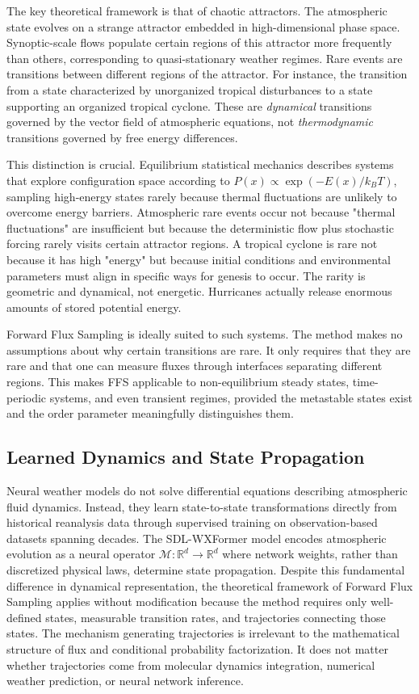 \documentclass[11pt]{article}
\begin{document}
The key theoretical framework is that of chaotic attractors. The atmospheric state evolves on a strange attractor embedded in high-dimensional phase space. Synoptic-scale flows populate certain regions of this attractor more frequently than others, corresponding to quasi-stationary weather regimes. Rare events are transitions between different regions of the attractor. For instance, the transition from a state characterized by unorganized tropical disturbances to a state supporting an organized tropical cyclone. These are \textit{dynamical} transitions governed by the vector field of atmospheric equations, not \textit{thermodynamic} transitions governed by free energy differences.

This distinction is crucial. Equilibrium statistical mechanics describes systems that explore configuration space according to $P(x) \propto \exp(-E(x)/k_BT)$, sampling high-energy states rarely because thermal fluctuations are unlikely to overcome energy barriers. Atmospheric rare events occur not because "thermal fluctuations" are insufficient but because the deterministic flow plus stochastic forcing rarely visits certain attractor regions. A tropical cyclone is rare not because it has high "energy" but because initial conditions and environmental parameters must align in specific ways for genesis to occur. The rarity is geometric and dynamical, not energetic. Hurricanes actually release enormous amounts of stored potential energy.

Forward Flux Sampling is ideally suited to such systems. The method makes no assumptions about why certain transitions are rare. It only requires that they are rare and that one can measure fluxes through interfaces separating different regions. This makes FFS applicable to non-equilibrium steady states, time-periodic systems, and even transient regimes, provided the metastable states exist and the order parameter meaningfully distinguishes them.

\subsection{Learned Dynamics and State Propagation}

Neural weather models do not solve differential equations describing atmospheric fluid dynamics. Instead, they learn state-to-state transformations directly from historical reanalysis data through supervised training on observation-based datasets spanning decades. The SDL-WXFormer model encodes atmospheric evolution as a neural operator $\mathcal{M}: \mathbb{R}^d \to \mathbb{R}^d$ where network weights, rather than discretized physical laws, determine state propagation. Despite this fundamental difference in dynamical representation, the theoretical framework of Forward Flux Sampling applies without modification because the method requires only well-defined states, measurable transition rates, and trajectories connecting those states. The mechanism generating trajectories is irrelevant to the mathematical structure of flux and conditional probability factorization. It does not matter whether trajectories come from molecular dynamics integration, numerical weather prediction, or neural network inference.
\end{document}
